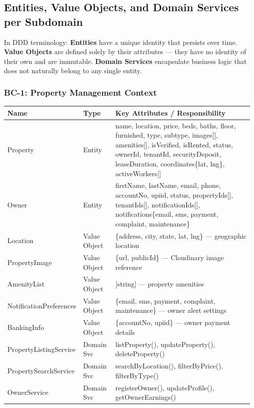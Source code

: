 \documentclass[12pt,a4paper]{article}
\begin{document}
\newpage

\subsection{Entities, Value Objects, and Domain Services per Subdomain}

In DDD terminology: \textbf{Entities} have a unique identity that persists over time. \textbf{Value Objects} are defined solely by their attributes — they have no identity of their own and are immutable. \textbf{Domain Services} encapsulate business logic that does not naturally belong to any single entity.

\subsubsection{BC-1: Property Management Context}

\begin{center}
\begin{tabular}{@{}p{3.5cm}p{2cm}p{8.5cm}@{}}
\toprule
\textbf{Name} & \textbf{Type} & \textbf{Key Attributes / Responsibility} \\
\midrule
Property & Entity & name, location, price, beds, baths, floor, furnished, type, subtype, images[], amenities[], isVerified, isRented, status, ownerId, tenantId, securityDeposit, leaseDuration, coordinates\{lat, lng\}, activeWorkers[] \\
Owner & Entity & firstName, lastName, email, phone, accountNo, upiid, status, propertyIds[], tenantIds[], notificationIds[], notifications\{email, sms, payment, complaint, maintenance\} \\
Location & Value Object & \{address, city, state, lat, lng\} — geographic location \\
PropertyImage & Value Object & \{url, publicId\} — Cloudinary image reference \\
AmenityList & Value Object & [string] — property amenities \\
NotificationPreferences & Value Object & \{email, sms, payment, complaint, maintenance\} — owner alert settings \\
BankingInfo & Value Object & \{accountNo, upiid\} — owner payment details \\
PropertyListingService & Domain Svc & listProperty(), updateProperty(), deleteProperty() \\
PropertySearchService & Domain Svc & searchByLocation(), filterByPrice(), filterByType() \\
OwnerService & Domain Svc & registerOwner(), updateProfile(), getOwnerEarnings() \\
\bottomrule
\end{tabular}
\end{center}
\end{document}
